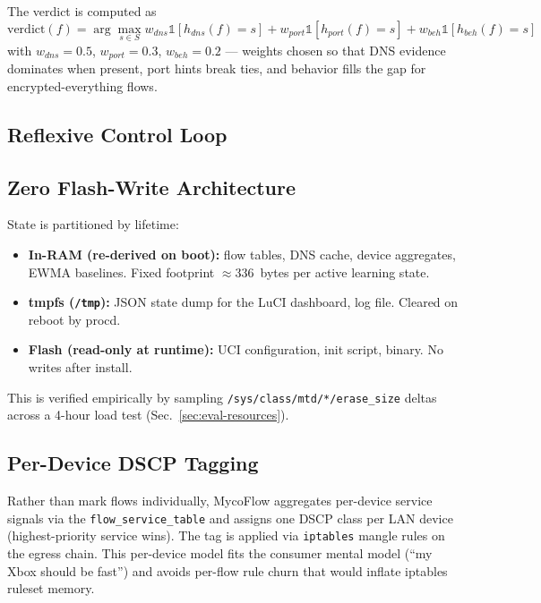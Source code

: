 \documentclass[journal,onecolumn]{IEEEtran}
\begin{document}
The verdict is computed as
\begin{equation}
\text{verdict}(f) = \arg\max_{s \in S}
   w_{dns} \mathbb{1}[h_{dns}(f)=s]
 + w_{port}\mathbb{1}[h_{port}(f)=s]
 + w_{beh} \mathbb{1}[h_{beh}(f)=s]
\label{eq:verdict}
\end{equation}
with $w_{dns}=0.5$, $w_{port}=0.3$, $w_{beh}=0.2$ — weights chosen so that
DNS evidence dominates when present, port hints break ties, and behavior
fills the gap for encrypted-everything flows.

\subsection{Reflexive Control Loop}


\subsection{Zero Flash-Write Architecture}

State is partitioned by lifetime:
\begin{itemize}
\item \textbf{In-RAM (re-derived on boot):} flow tables, DNS cache,
  device aggregates, EWMA baselines. Fixed footprint $\approx$336~bytes
  per active learning state.
\item \textbf{tmpfs (\texttt{/tmp}):} JSON state dump for the LuCI
  dashboard, log file. Cleared on reboot by procd.
\item \textbf{Flash (read-only at runtime):} UCI configuration,
  init script, binary. No writes after install.
\end{itemize}

This is verified empirically by sampling \texttt{/sys/class/mtd/*/erase\_size}
deltas across a 4-hour load test (Sec.~\ref{sec:eval-resources}).

\subsection{Per-Device DSCP Tagging}

Rather than mark flows individually, MycoFlow aggregates per-device
service signals via the \texttt{flow\_service\_table} and assigns one DSCP
class per LAN device (highest-priority service wins). The tag is applied
via \texttt{iptables} mangle rules on the egress chain. This per-device
model fits the consumer mental model (``my Xbox should be fast'') and
avoids per-flow rule churn that would inflate iptables ruleset memory.
\end{document}
